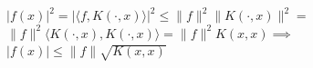 \documentclass[18pt]{article}
\begin{document}
\begin{flushleft}
\vspace{.4cm}
$\lvert f(x) \rvert^2=\lvert  \langle f, K(\cdot,x) \rangle \rvert^2 \leq \parallel f \parallel^2 \parallel K(\cdot,x) \parallel^2=$\\
$\parallel f \parallel^2 \langle K(\cdot,x),K(\cdot,x)\rangle=\parallel f \parallel^2 K(x,x) \implies$\\
$\lvert f(x) \rvert \leq \parallel f \parallel \sqrt{K(x,x)}$\\












\end{flushleft}
\end{document}
